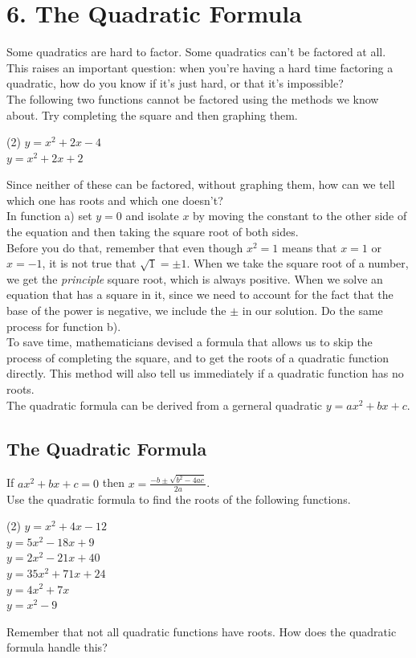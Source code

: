 \documentclass[12pt,fleqn]{book}
\begin{document}
\chapter{6. The Quadratic Formula}
Some quadratics are hard to factor.  Some quadratics can't be factored at all.  This raises an important question: when you're having a hard time factoring a quadratic, how do you know if it's just hard, or that it's impossible? 
\\[1em]
The following two functions cannot be factored using the methods we know about.  Try completing the square and then graphing them.
\begin{tasks}(2)
	\task $y=x^{2}+2x-4$\\[4em]
	\task $y=x^{2}+2x+2$\\[4em]
\end{tasks}
Since neither of these can be factored, without graphing them, how can we tell which one has roots and which one doesn't?
\\[1em]
In function a) set $y=0$ and isolate $x$ by moving the constant to the other side of the equation and then taking the square root of both sides.
\\[1em]
Before you do that, remember that even though $x^2=1$ means that $x=1$ or $x=-1$, it is not true that $\sqrt 1 = \pm 1$.  When we take the square root of a number, we get the \emph{principle} square root, which is always positive.  When we solve an equation that has a square in it, since we need to account for the fact that the base of the power is negative, we include the $\pm$ in our solution.
\clearpage
Do the same process for function b).
\\[3in]
To save time, mathematicians devised a formula that allows us to skip the process of completing the square, and to get the roots of a quadratic function directly.  This method will also tell us immediately if a quadratic function has no roots.
\\[1em]
The quadratic formula can be derived from a gerneral quadratic $y=ax^2+bx+c$.
\clearpage
\section*{The Quadratic Formula}
If $ax^2+bx+c=0$ then ${\displaystyle x=\frac{-b\pm \sqrt{b^2-4ac}}{2a}}$.
\\[1em]
Use the quadratic formula to find the roots of the following functions.
\begin{tasks}(2)
	\task$y = x^2 + 4x - 12$\\[2.5in]
	\task$y = 5x^2 -18 x + 9$\\[2.5in]
	\task$y = 2x^2 -21x + 40$\\[2.5in]
	\task$y = 35x^2 + 71x +24 $\\[2.5in]
	\task$y = 4x^2 + 7x $\\[2.5in]
	\task$y = x^2 - 9 $\\[2.5in]
\end{tasks}
Remember that not all quadratic functions have roots.  How does the quadratic formula handle this?
\end{document}
